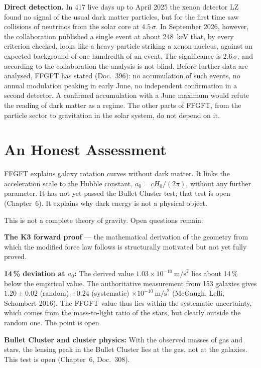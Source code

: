 \documentclass[11pt,oneside]{book}
\begin{document}
\textbf{Direct detection.} In 417 live days up to April 2025 the
xenon detector LZ found no signal of the usual dark matter
particles, but for the first time saw collisions of neutrinos
from the solar core at $4.5\,\sigma$. In September 2026, however,
the collaboration published a single event at about 248~keV
that, by every criterion checked, looks like a heavy particle
striking a xenon nucleus, against an expected background of one
hundredth of an event. The significance is $2.6\,\sigma$, and
according to the collaboration the analysis is not blind. Before
further data are analysed, FFGFT has stated (Doc.~396): no
accumulation of such events, no annual modulation peaking in
early June, no independent confirmation in a second detector. A
confirmed accumulation with a June maximum would refute the
reading of dark matter as a regime. The other parts of FFGFT,
from the particle sector to gravitation in the solar system, do
not depend on it.

\chapter{An Honest Assessment}

FFGFT explains galaxy rotation curves without dark matter.
It links the acceleration scale to the Hubble constant,
$a_0 = cH_0/(2\pi)$, without any further parameter. It has not yet passed the Bullet Cluster test;
that test is open (Chapter~6). It explains
why dark energy is not a physical object.

This is not a complete theory of gravity. Open questions
remain:

\textbf{The K3 forward proof} — the mathematical derivation
of the geometry from which the modified force law follows
is structurally motivated but not yet fully proved.

\textbf{14\,\% deviation at $a_0$:} The derived value
$1.03 \times 10^{-10}~\text{m/s}^2$ lies about 14\,\% below the
empirical value. The authoritative measurement from 153 galaxies
gives $1.20 \pm 0.02$ (random) $\pm 0.24$ (systematic)
$\times 10^{-10}~\text{m/s}^2$ (McGaugh, Lelli, Schombert 2016).
The FFGFT value thus lies within the systematic uncertainty,
which comes from the mass-to-light ratio of the stars, but
clearly outside the random one. The point is open.

\textbf{Bullet Cluster and cluster physics:} With the observed
masses of gas and stars, the lensing peak in the Bullet
Cluster lies at the gas, not at the galaxies. This test is
open (Chapter~6, Doc.~308).
\end{document}
